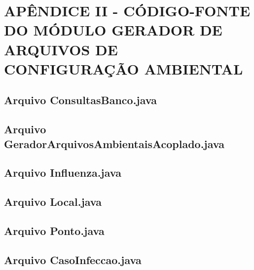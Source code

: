 \section{APÊNDICE II - CÓDIGO-FONTE DO MÓDULO GERADOR DE ARQUIVOS DE CONFIGURAÇÃO AMBIENTAL}

\subsection{Arquivo ConsultasBanco.java}



\newpage

\subsection{Arquivo GeradorArquivosAmbientaisAcoplado.java}



\newpage

\subsection{Arquivo Influenza.java}



\newpage

\subsection{Arquivo Local.java}



\newpage

\subsection{Arquivo Ponto.java}



\newpage

\subsection{Arquivo CasoInfeccao.java}

